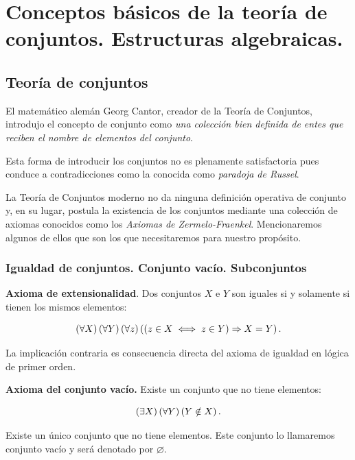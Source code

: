 \chapter{Conceptos básicos de la teoría de conjuntos. Estructuras algebraicas.}

\section{Teoría de conjuntos}

El matemático alemán Georg Cantor, creador de la Teoría de Conjuntos, introdujo el concepto de conjunto como \textit{una colección bien definida de entes que reciben el nombre de elementos del conjunto}. 

Esta forma de introducir los conjuntos no es plenamente satisfactoria pues conduce a contradicciones como la conocida como \textit{paradoja de Russel}. 

La Teoría de Conjuntos moderno no da ninguna definición operativa de conjunto y, en su lugar, postula la existencia de los conjuntos mediante una colección de axiomas conocidos como los \textit{Axiomas de Zermelo-Fraenkel}. Mencionaremos algunos de ellos que son los que necesitaremos para nuestro propósito.

\subsection{Igualdad de conjuntos. Conjunto vacío. Subconjuntos}

\textbf{Axioma de extensionalidad}. Dos conjuntos $X$ e $Y$ son iguales si y solamente si tienen los mismos elementos:

\begin{equation}
  \left(\forall X\right)\left(\forall Y\right)\left(\forall z\right)\left(\left(z\in X\iff z\in Y\right)\Rightarrow X=Y\right).
\end{equation}

La implicación contraria es consecuencia directa del axioma de igualdad en lógica de primer orden.

\textbf{Axioma del conjunto vacío.} Existe un conjunto que no tiene elementos:

\begin{equation}
  \left(\exists X\right)\left(\forall Y\right)\left(Y\notin X\right).
\end{equation}


\begin{proposition}
  \rm Existe un único conjunto que no tiene elementos. Este conjunto lo llamaremos conjunto vacío y será denotado por $\varnothing$.
\end{proposition}


